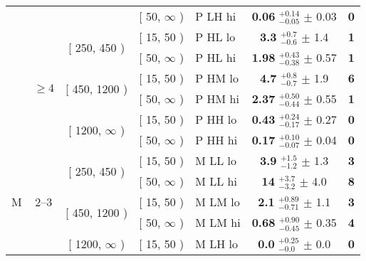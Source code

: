 \begin{table}[htbp]
\begin{tabular}{cccclcc}
& & & [ 50, $\infty$ ) & P LH hi & \textbf{0.06} $^{+0.14}_{-0.05}$ $\pm$ 0.03 & \textbf{0}\\ %

%

& \multirow{6}{*}{$\geq 4$} & \multirow{2}{*}{[ 250, 450 )} & [ 15, 50 ) & P HL lo & \textbf{3.3} $^{+0.7}_{-0.6}$ $\pm$ 1.4 & \textbf{1}\\ %

& & & [ 50, $\infty$ ) & P HL hi & \textbf{1.98} $^{+0.43}_{-0.38}$ $\pm$ 0.57 & \textbf{1}\\ %

& & \multirow{2}{*}{[ 450, 1200 )} & [ 15, 50 ) & P HM lo & \textbf{4.7} $^{+0.8}_{-0.7}$ $\pm$ 1.9 & \textbf{6}\\ %

& & & [ 50, $\infty$ ) & P HM hi & \textbf{2.37} $^{+0.50}_{-0.44}$ $\pm$ 0.55 & \textbf{1}\\ %

& & \multirow{2}{*}{[ 1200, $\infty$ )} & [ 15, 50 ) & P HH lo & \textbf{0.43} $^{+0.24}_{-0.17}$ $\pm$ 0.27 & \textbf{0}\\ %

& & & [ 50, $\infty$ ) & P HH hi & \textbf{0.17} $^{+0.10}_{-0.07}$ $\pm$ 0.04 & \textbf{0}\\ %

\hline

\multirow{12}{*}{M} 

& \multirow{6}{*}{2--3} & \multirow{2}{*}{[ 250, 450 )} & [ 15, 50 ) & M LL lo & \textbf{3.9} $^{+1.5}_{-1.2}$ $\pm$ 1.3 & \textbf{3}\\ %

& & & [ 50, $\infty$ ) & M LL hi & \textbf{14} $^{+3.7}_{-3.2}$ $\pm$ 4.0 & \textbf{8}\\ %

& & \multirow{2}{*}{[ 450, 1200 )} & [ 15, 50 ) & M LM lo & \textbf{2.1} $^{+0.89}_{-0.71}$ $\pm$ 1.1 & \textbf{3}\\ %

& & & [ 50, $\infty$ ) & M LM hi & \textbf{0.68} $^{+0.90}_{-0.45}$ $\pm$ 0.35 & \textbf{4}\\ %

& & \multirow{2}{*}{[ 1200, $\infty$ )} & [ 15, 50 ) & M LH lo & \textbf{0.0} $^{+0.25}_{-0.0}$ $\pm$ 0.0 & \textbf{0}\\ %


\end{tabular}
\end{table}
